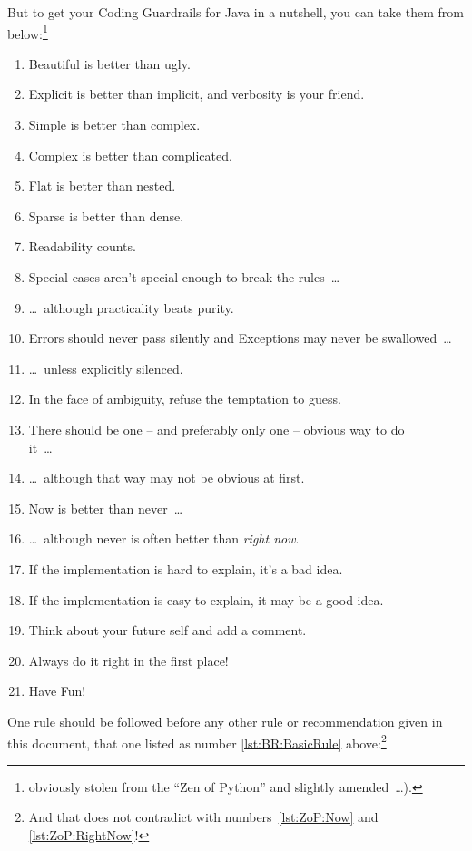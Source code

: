 But to get your Coding Guardrails for Java in a nutshell, you can take them from below:\footnote{obviously stolen from the “Zen of Python”\autocite{WIKIPEDIA:ZenOfPython,PYTHON_ORG_MAILING_LIST:ThePythonWay} and slightly amended~…).}
\begin{enumerate}[nosep]
\item Beautiful is better than ugly.
\item Explicit is better than implicit, and verbosity is your friend.\label{lst:ZoP:ExplicitVsImplicit}
\item Simple is better than complex.\label{lst:ZoP:SimpleVsComplex}
\item Complex is better than complicated.\label{lst:ZoP:ComplexVsComplicated}
\item Flat is better than nested.
\item Sparse is better than dense.
\item Readability counts.\label{lst:ZoP:Readablity}
\item Special cases aren't special enough to break the rules~…\label{lst:ZoP:SpecialCases}
\item …~although practicality beats purity.\label{lst:ZoP:Practicality}
\item Errors should never pass silently and Exceptions may never be swallowed~…
\item …~unless explicitly silenced.
\item In the face of ambiguity, refuse the temptation to guess.
\item There should be one – and preferably only one – obvious way to do\\ it~…
\item …~although that way may not be obvious at first.
\item Now is better than never~…\label{lst:ZoP:Now}
\item …~although never is often better than \textit{right now}.\label{lst:ZoP:RightNow}
\item If the implementation is hard to explain, it's a bad idea.
\item If the implementation is easy to explain, it may be a good idea.
\item Think about your future self and add a comment.
\item Always do it right in the first place!\label{lst:BR:BasicRule}
\item Have Fun!
\end{enumerate}

One rule should be followed before any other rule or recommendation given in this document, that one listed as number \ref{lst:BR:BasicRule} above:\footnote{And that does not contradict with numbers~\ref{lst:ZoP:Now} and \ref{lst:ZoP:RightNow}!}

